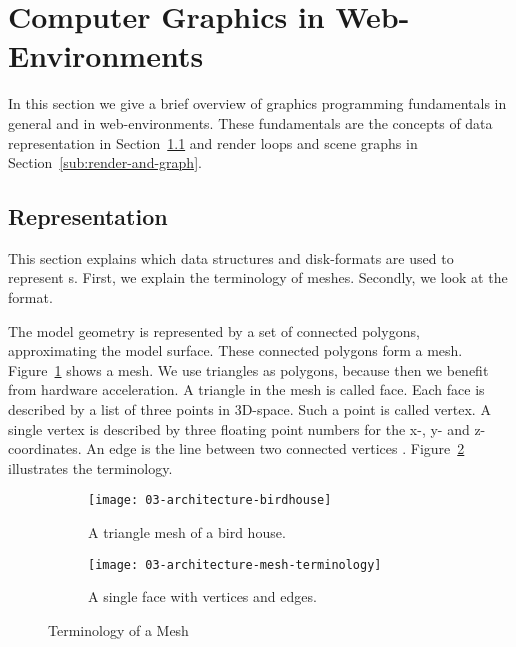\documentclass[../03-Architecture.tex]{subfiles}
\begin{document}
\section{Computer Graphics in Web-Environments}
\label{sec:cg-web}

In this section we give a brief overview of graphics programming
fundamentals in general and in web-environments. These fundamentals
are the concepts of {\threedmodel} data representation in
Section~\ref{sub:model-representation} and render loops and scene
graphs in Section~\ref{sub:render-and-graph}.

\subsection{{\threedmodel} Representation}
\label{sub:model-representation}

This section explains which data structures and disk-formats are used
to represent {\threedmodel}s. First, we explain the terminology of
meshes. Secondly, we look at the {\stlfile} format.

The model geometry is represented by a set of connected polygons,
approximating the model surface. These connected polygons form a mesh.
Figure~\ref{fig:term-mesh:mesh} shows a mesh. We use triangles as
polygons, because then we benefit from hardware acceleration. A
triangle in the mesh is called face. Each face is described by a list
of three points in 3D-space. Such a point is called vertex. A single
vertex is described by three floating point numbers for the x-, y- and
z-coordinates. An edge is the line between two connected vertices
\cite[p.~3]{cg-intro}. Figure~\ref{fig:term-mesh:face} illustrates the
terminology.

\begin{figure}[h]
  \centering
  \begin{subfigure}[b]{0.49\textwidth}
    \centering
    \texttt{[image: 03-architecture-birdhouse]}
    \caption{A triangle mesh of a bird house.}
    \label{fig:term-mesh:mesh}
  \end{subfigure}
  \begin{subfigure}[b]{0.49\textwidth}
    \centering
    \texttt{[image: 03-architecture-mesh-terminology]}
    \caption{A single face with vertices and edges.}
    \label{fig:term-mesh:face}
  \end{subfigure}
  \caption{Terminology of a Mesh}
  \label{fig:term-mesh}
\end{figure}
\end{document}
